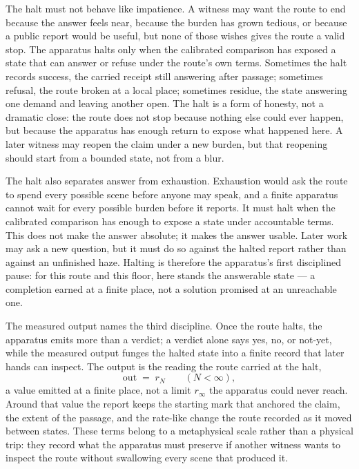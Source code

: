 The halt must not behave like impatience. A witness may want the route to end because the answer feels near, because the burden has grown tedious, or because a public report would be useful, but none of those wishes gives the route a valid stop. The apparatus halts only when the calibrated comparison has exposed a state that can answer or refuse under the route's own terms. Sometimes the halt records success, the carried receipt still answering after passage; sometimes refusal, the route broken at a local place; sometimes residue, the state answering one demand and leaving another open. The halt is a form of honesty, not a dramatic close: the route does not stop because nothing else could ever happen, but because the apparatus has enough return to expose what happened here. A later witness may reopen the claim under a new burden, but that reopening should start from a bounded state, not from a blur.

The halt also separates answer from exhaustion. Exhaustion would ask the route to spend every possible scene before anyone may speak, and a finite apparatus cannot wait for every possible burden before it reports. It must halt when the calibrated comparison has enough to expose a state under accountable terms. This does not make the answer absolute; it makes the answer usable. Later work may ask a new question, but it must do so against the halted report rather than against an unfinished haze. Halting is therefore the apparatus's first disciplined pause: for this route and this floor, here stands the answerable state --- a completion earned at a finite place, not a solution promised at an unreachable one.

The measured output names the third discipline. Once the route halts, the apparatus emits more than a verdict; a verdict alone says yes, no, or not-yet, while the measured output funges the halted state into a finite record that later hands can inspect. The output is the reading the route carried at the halt,
\[ \mathrm{out} \;=\; r_N \qquad (N < \infty), \]
a value emitted at a finite place, not a limit $r_\infty$ the apparatus could never reach. Around that value the report keeps the starting mark that anchored the claim, the extent of the passage, and the rate-like change the route recorded as it moved between states. These terms belong to a metaphysical scale rather than a physical trip: they record what the apparatus must preserve if another witness wants to inspect the route without swallowing every scene that produced it.

